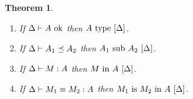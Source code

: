 \documentclass[]{article}
\newtheorem{theorem}{Theorem}
\begin{document}
\begin{theorem}
\begin{enumerate}
\item If $\Delta\vdash A\mbox{\ ok}$ then ${A}\mathrm{\ type\ }[\Delta]$.
\item If $\mbox{$\Delta\vdash A_1 \preceq A_2$}$ then
${A_1}\mathrm{\ sub\ }{A_2}\ [\Delta]$.
\item If $\Delta\vdash M : A$ then
${M}\mathrm{\ in\ }{A}\ [\Delta]$.
\item If $\Delta\vdash M_1 \equiv M_2 : A$
then ${M_1}\mathrm{\ is\ }{M_2}\mathrm{\ in\ }{A}\ [\Delta]$.
\end{enumerate}
\end{theorem}

%
%
\end{document}
